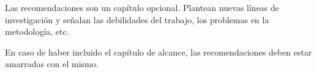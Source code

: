 Las recomendaciones son un capítulo opcional. Plantean nuevas líneas de investigación y señalan las debilidades del trabajo, los problemas en la metodología, etc. 

En caso de haber incluido el capítulo de alcance, las recomendaciones deben estar amarradas con el mismo.